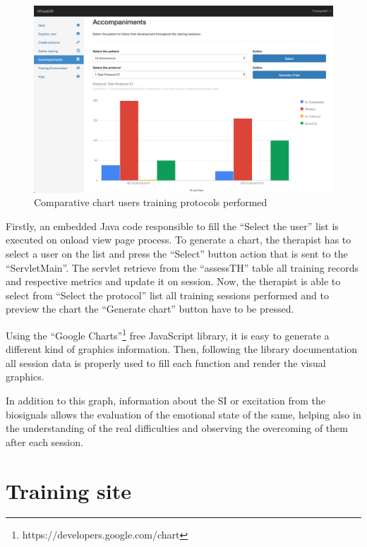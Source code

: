 \begin{figure}[!hbt]
\begin{center}
\includegraphics[width=1\linewidth]{img/cap5/tGenerateChart02}
\caption{Comparative chart users training protocols performed} \label{fig:tGenerateChart02}
\end{center}
\end{figure}

Firstly, an embedded Java code responsible to fill the ``Select the user'' list is executed on onload view page process. To generate a chart, the therapist has to select a user on the list and press the ``Select'' button action that is sent to the ``ServletMain''. The servlet retrieve from the ``assessTH'' table all training records and respective metrics and update it on session. Now, the therapist is able to select from ``Select the protocol'' list all training sessions performed and to preview the chart the ``Generate chart'' button have to be pressed.

Using the ``Google Charts''\footnote{https://developers.google.com/chart} free JavaScript library, it is easy to generate a different kind of graphics information. Then, following the library documentation all session data is properly used to fill each function and render the visual graphics. 

In addition to this graph, information about the SI or excitation from the biosignals allows the evaluation of the emotional state of the same, helping also in the understanding of the real difficulties and observing the overcoming of them after each session. 

\section{Training site}
\label{sec:impltrainingsite}

